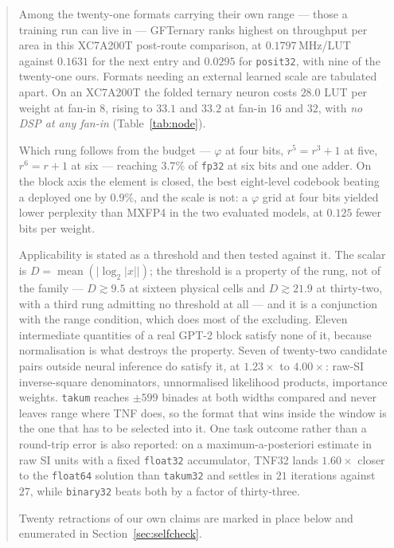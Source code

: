 \documentclass[11pt]{article}
\theoremstyle{definition}
\begin{document}
\begin{abstract}
Among the twenty-one formats carrying their own range --- those a training run can
live in --- GFTernary ranks highest on throughput per area in this XC7A200T post-route
comparison, at $0.1797$\,MHz/LUT against $0.1631$ for the next entry and $0.0295$
for \texttt{posit32}, with nine of the twenty-one ours. Formats needing
an external learned scale are tabulated apart. On an XC7A200T the folded
ternary neuron costs $28.0$ LUT per weight at fan-in $8$, rising to $33.1$ and
$33.2$ at fan-in $16$ and $32$, with \emph{no DSP at any fan-in}
(Table~\ref{tab:node}).

Which rung follows from the budget --- $\varphi$ at four bits, $r^5{=}r^3{+}1$ at
five, $r^6{=}r{+}1$ at six --- reaching $3.7\%$ of \texttt{fp32} at six bits and
one adder. On the block axis the element is closed, the best eight-level
codebook beating a deployed one by $0.9\%$, and the scale is not: a $\varphi$
grid at four bits yielded lower perplexity than MXFP4 in the two evaluated models,
at $0.125$ fewer bits per weight.

Applicability is stated as a threshold and then tested against it. The scalar is
$D=\operatorname{mean}(\lvert\log_2|x|\rvert)$; the threshold is a property of the
rung, not of the family --- $D \gtrsim 9.5$ at sixteen physical cells and
$D \gtrsim 21.9$ at thirty-two, with a third rung admitting no threshold at all ---
and it is a conjunction with the range condition, which does most of the excluding.
Eleven intermediate quantities of a real GPT-2 block satisfy none of it, because
normalisation is what destroys the property. Seven of twenty-two candidate pairs
outside neural inference do satisfy it, at $1.23\times$ to $4.00\times$: raw-SI
inverse-square denominators, unnormalised likelihood products, importance weights.
\texttt{takum} reaches $\pm 599$ binades at both widths compared and never leaves
range where TNF does, so the format that wins inside the window is the one that has
to be selected into it. One task outcome rather than a round-trip error is also
reported: on a maximum-a-posteriori estimate in raw SI units with a fixed
\texttt{float32} accumulator, TNF32 lands $1.60\times$ closer to the
\texttt{float64} solution than \texttt{takum32} and settles in $21$ iterations
against $27$, while \texttt{binary32} beats both by a factor of thirty-three.

Twenty retractions of our own claims are marked in place below and enumerated in
Section~\ref{sec:selfcheck}.
\end{abstract}
\end{document}

